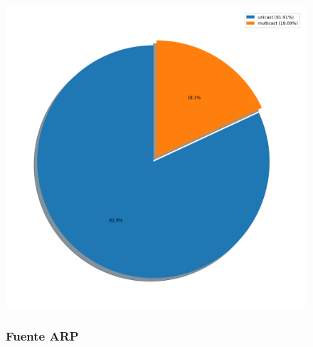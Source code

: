 \begin{figure}
\centering
 \includegraphics[scale=0.4]{../plots/trabajo_s1_probabilidades.png}

\subsubsection{Fuente ARP}


\end{figure}
